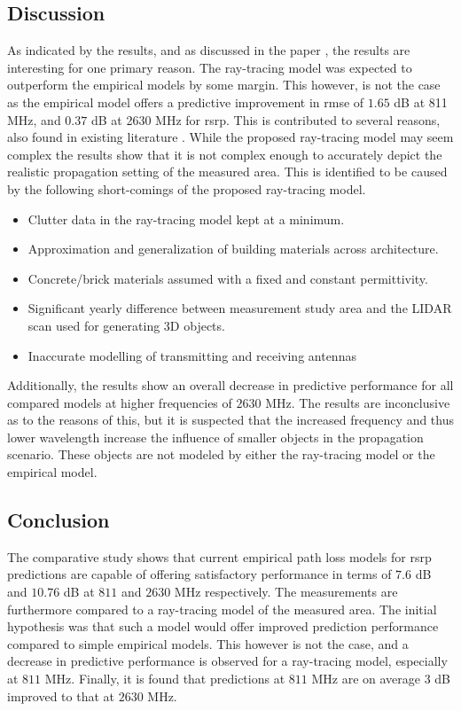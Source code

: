 \subsection{Discussion}
As indicated by the results, and as discussed in the paper \cite{Thrane2019ComparisonGHz}, the results are interesting for one primary reason. The ray-tracing model was expected to outperform the empirical models by some margin. This however, is not the case as the empirical  model offers a predictive improvement in \gls{rmse} of $1.65$ dB at 811 MHz, and $0.37$ dB at 2630 MHz for \gls{rsrp}. This is contributed to several reasons, also found in existing literature \cite{Vitucci2015}. While the proposed ray-tracing model may seem complex the results show that it is not complex enough to accurately depict the realistic propagation setting of the measured area. This is identified to be caused by the following short-comings of the proposed ray-tracing model.

\begin{itemize}
    \item Clutter data in the ray-tracing model kept at a minimum.
    \item Approximation and generalization of building materials across architecture. 
    \item Concrete/brick materials assumed with a fixed and constant permittivity.
    \item Significant yearly difference between measurement study area and the LIDAR scan used for generating 3D objects.
    \item Inaccurate modelling of transmitting and receiving antennas
\end{itemize}

Additionally, the results show an overall decrease in predictive performance for all compared models at higher frequencies of $2630$ MHz. The results are inconclusive as to the reasons of this, but it is suspected that the increased frequency and thus lower wavelength increase the influence of smaller objects in the propagation scenario. These objects are not modeled by either the ray-tracing model or the empirical model.

\subsection{Conclusion}
The comparative study shows that current empirical path loss models for \gls{rsrp} predictions are capable of offering satisfactory performance in terms of $7.6$ dB and $10.76$ dB at $811$ and $2630$ MHz respectively. The measurements are furthermore compared to a ray-tracing model of the measured area. The initial hypothesis was that such a model would offer improved prediction performance compared to simple empirical models. This however is not the case, and a decrease in predictive performance is observed for a ray-tracing model, especially at $811$ MHz. Finally, it is found that predictions at $811$ MHz are on average $3$ dB improved to that at $2630$ MHz. 



